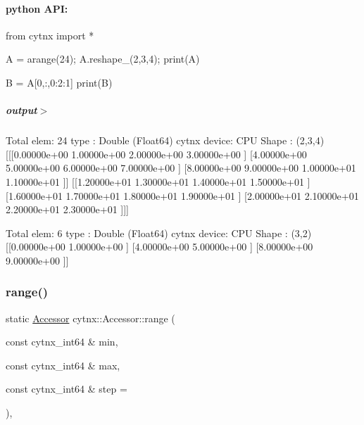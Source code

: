  \paragraph*{python A\+PI\+:}


\begin{DoxyCodeInclude}
\textcolor{keyword}{from} cytnx \textcolor{keyword}{import} *

A = arange(24);
A.reshape\_(2,3,4);
print(A)


B = A[0,:,0:2:1]
print(B)

\end{DoxyCodeInclude}
 \subparagraph*{output$>$}


\begin{DoxyVerbInclude}

Total elem: 24
type  : Double (Float64)
cytnx device: CPU
Shape : (2,3,4)
[[[0.00000e+00 1.00000e+00 2.00000e+00 3.00000e+00 ]
  [4.00000e+00 5.00000e+00 6.00000e+00 7.00000e+00 ]
  [8.00000e+00 9.00000e+00 1.00000e+01 1.10000e+01 ]]
 [[1.20000e+01 1.30000e+01 1.40000e+01 1.50000e+01 ]
  [1.60000e+01 1.70000e+01 1.80000e+01 1.90000e+01 ]
  [2.00000e+01 2.10000e+01 2.20000e+01 2.30000e+01 ]]]



Total elem: 6
type  : Double (Float64)
cytnx device: CPU
Shape : (3,2)
[[0.00000e+00 1.00000e+00 ]
 [4.00000e+00 5.00000e+00 ]
 [8.00000e+00 9.00000e+00 ]]




\end{DoxyVerbInclude}
 \mbox{\label{classcytnx_1_1Accessor_a7a5a508a58b71897c3dd162195aceaa9}} 
\subsubsection{\texorpdfstring{range()}{range()}}
{\footnotesize\ttfamily static \hyperlink{classcytnx_1_1Accessor}{Accessor} cytnx\+::\+Accessor\+::range (\begin{DoxyParamCaption}\item[{const cytnx\+\_\+int64 \&}]{min,  }\item[{const cytnx\+\_\+int64 \&}]{max,  }\item[{const cytnx\+\_\+int64 \&}]{step = {} }\end{DoxyParamCaption})\hspace{0.3cm}{\ttfamily [inline]}, {\ttfamily [static]}}



